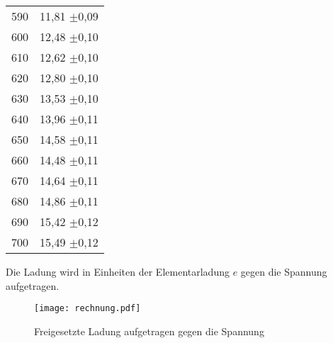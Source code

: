 \begin{table}[H]
\begin{tabular}{c c}
      590 &        11,81   $\pm$0,09 \\
      600 &        12,48   $\pm$0,10 \\
      610 &        12,62   $\pm$0,10 \\
      620 &        12,80   $\pm$0,10 \\
      630 &        13,53   $\pm$0,10 \\
      640 &        13,96   $\pm$0,11 \\
      650 &        14,58   $\pm$0,11 \\
      660 &        14,48   $\pm$0,11 \\
      670 &        14,64   $\pm$0,11 \\
      680 &        14,86   $\pm$0,11 \\
      690 &        15,42   $\pm$0,12 \\
      700 &        15,49   $\pm$0,12 \\
    \bottomrule
  \end{tabular}
\end{table}

Die Ladung wird in Einheiten der Elementarladung $e$ gegen die Spannung aufgetragen.


\begin{figure}
  \centering
  \texttt{[image: rechnung.pdf]}
  \caption{Freigesetzte Ladung aufgetragen gegen die Spannung}
  \label{fig:plot}
\end{figure}
